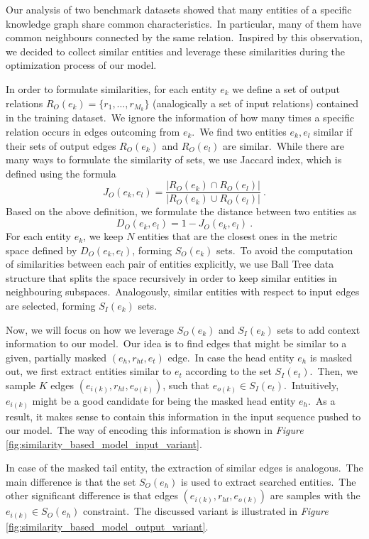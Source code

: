 \documentclass[longabstract, english, mgr]{iithesis}
\theoremstyle{default_theorem_style}\newtheorem{theorem}{Theorem}
\theoremstyle{default_theorem_style}\newtheorem{definition}{Definition}
\begin{document}
Our analysis of two benchmark datasets showed that many entities of a specific knowledge graph share common
characteristics.\ In particular, many of them have common neighbours connected by the same relation.\ Inspired by
this observation, we decided to collect similar entities and leverage these similarities during the optimization
process of our model.\newline

\noindent In order to formulate similarities, for each entity $e_k$ we define a set of output
relations $R_O(e_k) = \{r_1, \dots, r_{M_k}\}$ (analogically a set of input relations) contained in the training
dataset.\ We ignore the information of how many times a specific relation occurs in edges outcoming from
$e_k$.\ We find two entities $e_k, e_l$ similar if their sets of output edges $R_O(e_k)$ and $R_O(e_l)$ are
similar.\ While there are many ways to formulate the similarity of sets, we use Jaccard index, which is defined using
the formula
$$
J_O(e_k, e_l) = \frac{|R_O(e_k) \cap R_O(e_l)|}{|R_O(e_k) \cup R_O(e_l)|}\ .
$$
Based on the above definition, we formulate the distance between two entities as
$$
D_O(e_k, e_l) = 1 - J_O(e_k, e_l)\ .
$$
For each entity $e_k$, we keep $N$ entities that are the closest ones in the metric space defined by
$D_O(e_k, e_l)$, forming $S_O(e_k)$ sets.\ To avoid the computation of similarities between each pair of entities
explicitly, we use Ball Tree data structure that splits the space recursively in order to keep similar entities
in neighbouring subspaces.\ Analogously, similar entities with respect to input edges are selected, forming
$S_I(e_k)$ sets.\newline

\noindent Now, we will focus on how we leverage $S_O(e_k)$ and $S_I(e_k)$ sets to add context information to our
model.\ Our idea is to find edges that might be similar to a given, partially masked $(e_h, r_{ht}, e_t)$
edge.\ In case the head entity $e_h$ is masked out, we first extract entities similar to $e_t$ according to the
set $S_I(e_t)$.\ Then, we sample $K$ edges $(e_{i(k)}, r_{ht}, e_{o(k)})$, such that
$e_{o(k)} \in S_I(e_t)$.\ Intuitively, $e_{i(k)}$ might be a good candidate for being the masked head entity $e_h$.\ As
a result, it makes sense to contain this information in the input sequence pushed to our model.\ The way of encoding
this information is shown in \textit{Figure} \ref{fig:similarity_based_model_input_variant}.\newline

\noindent In case of the masked tail entity, the extraction of similar edges is analogous.\ The main difference is
that the set $S_O(e_h)$ is used to extract searched entities.\ The other significant difference is that edges
$(e_{i(k)}, r_{ht}, e_{o(k)})$ are samples with the $e_{i(k)} \in S_O(e_h)$ constraint.\ The discussed variant is
illustrated in \textit{Figure} \ref{fig:similarity_based_model_output_variant}.\newline
\end{document}
